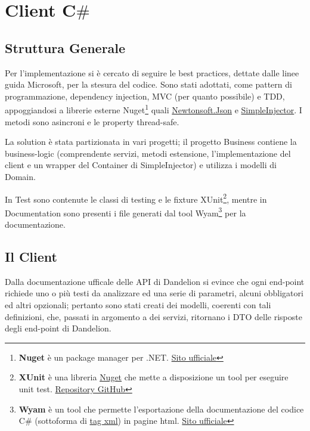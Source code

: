 
\chapter{Client C$\#$}
\section{Struttura Generale}

Per l'implementazione si è cercato di seguire le best practices, dettate dalle linee guida Microsoft, per la stesura del codice.
Sono stati adottati, come pattern di programmazione, dependency injection, MVC (per quanto possibile) e TDD, appoggiandosi a librerie esterne Nuget\footnote{
    \textbf{Nuget} è un package manager per .NET. \href{https://www.nuget.org/}{Sito ufficiale}
} quali 
\href{https://www.nuget.org/packages/newtonsoft.json/}{Newtonsoft.Json} e \href{https://www.nuget.org/packages/SimpleInjector/}{SimpleInjector}. I metodi sono asincroni e le property thread-safe.

La solution è stata partizionata in vari progetti; il progetto Business contiene la business-logic 
(comprendente servizi, metodi estensione, l'implementazione del client e un wrapper del Container di SimpleInjector) e utilizza i modelli di Domain.

In Test sono contenute le classi di testing e le fixture XUnit\footnote{
    \textbf{XUnit} è una libreria \href{https://www.nuget.org/packages/xunit/}{Nuget} che mette a disposizione un tool per eseguire unit test. \href{https://github.com/xunit/xunit}{Repository GitHub}    
}, mentre in Documentation sono presenti i file generati dal tool Wyam\footnote{
    \textbf{Wyam} è un tool che permette l'esportazione della documentazione del codice C$\#$ 
    (sottoforma di \href{https://docs.microsoft.com/en-us/dotnet/csharp/codedoc}{tag xml}) in pagine html. \href{https://wyam.io/}{Sito ufficiale}
} per la documentazione.

\section{Il Client}

Dalla documentazione ufficale delle API di Dandelion si evince che ogni end-point richiede uno o più testi da analizzare ed una serie di parametri, alcuni obbligatori ed altri 
opzionali; 
pertanto sono stati creati dei modelli, coerenti con tali definizioni, che, passati in argomento a dei servizi, ritornano i DTO delle risposte degli end-point di Dandelion.

